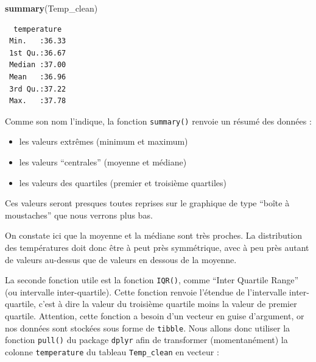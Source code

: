 \documentclass[a4paperpaper,]{article}
\newenvironment{Shaded}{\begin{snugshade}}{\end{snugshade}}
\newcommand{\KeywordTok}[1]{\textcolor[rgb]{0.12,0.11,0.11}{\textbf{#1}}}
\newcommand{\NormalTok}[1]{\textcolor[rgb]{0.12,0.11,0.11}{#1}}
\newcommand{\OperatorTok}[1]{\textcolor[rgb]{0.12,0.11,0.11}{#1}}
\newcommand{\StringTok}[1]{\textcolor[rgb]{0.75,0.01,0.01}{#1}}
\providecommand{\tightlist}{%
  \setlength{\itemsep}{0pt}\setlength{\parskip}{0pt}}
\begin{document}
\begin{Shaded}
\begin{Highlighting}[]
\KeywordTok{summary}\NormalTok{(Temp_clean)}
\end{Highlighting}
\end{Shaded}

\begin{verbatim}
  temperature   
 Min.   :36.33  
 1st Qu.:36.67  
 Median :37.00  
 Mean   :36.96  
 3rd Qu.:37.22  
 Max.   :37.78  
\end{verbatim}

Comme son nom l'indique, la fonction \texttt{summary()} renvoie un résumé des données :

\begin{itemize}
\tightlist
\item
  les valeurs extrêmes (minimum et maximum)
\item
  les valeurs ``centrales'' (moyenne et médiane)
\item
  les valeurs des quartiles (premier et troisième quartiles)
\end{itemize}

Ces valeurs seront presques toutes reprises sur le graphique de type ``boîte à moustaches'' que nous verrons plus bas.

On constate ici que la moyenne et la médiane sont très proches. La distribution des températures doit donc être à peut près symmétrique, avec à peu près autant de valeurs au-dessus que de valeurs en dessous de la moyenne.

La seconde fonction utile est la fonction \texttt{IQR()}, comme ``Inter Quartile Range'' (ou intervalle inter-quartile). Cette fonction renvoie l'étendue de l'intervalle inter-quartile, c'est à dire la valeur du troisième quartile moins la valeur de premier quartile. Attention, cette fonction a besoin d'un vecteur en guise d'argument, or nos données sont stockées sous forme de \texttt{tibble}. Nous allons donc utiliser la fonction \texttt{pull()} du package \texttt{dplyr} afin de transformer (momentanément) la colonne \texttt{temperature} du tableau \texttt{Temp\_clean} en vecteur :

\begin{Shaded}
\end{Shaded}
\end{document}
